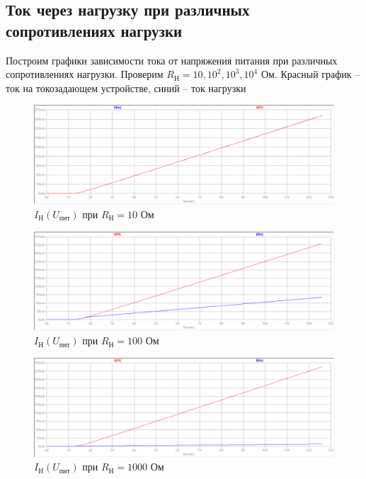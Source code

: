 \documentclass[a4paper, 12pt]{article}
\begin{document}
    \subsection{Ток через нагрузку при различных сопротивлениях нагрузки}
    Построим графики зависимости тока от напряжения питания при различных сопротивлениях нагрузки.
    Проверим $R_\text{Н}=10,10^2,10^3,10^4$ Ом. Красный график -- ток на токозадающем устройстве,
    синий -- ток нагрузки
    \begin{figure}[H]
        \centering
        \includegraphics[scale=0.46]{2task_Iн(Vпит)_Rн10.png}
        \captionsetup{skip=0pt}
        \caption{$I_\text{Н}\left( U_\text{пит} \right)$ при $R_\text{Н}=10$ Ом}
        \label{fig:2task_InVlR10}
    \end{figure}
    \begin{figure}[H]
        \centering
        \includegraphics[scale=0.46]{2task_Iн(Vпит)_Rн100.png}
        \captionsetup{skip=0pt}
        \caption{$I_\text{Н}\left( U_\text{пит} \right)$ при $R_\text{Н}=100$ Ом}
        \label{fig:2task_InVlR100}
    \end{figure}
    \begin{figure}[H]
        \centering
        \includegraphics[scale=0.46]{2task_Iн(Vпит)_Rн1000.png}
        \captionsetup{skip=0pt}
        \caption{$I_\text{Н}\left( U_\text{пит} \right)$ при $R_\text{Н}=1000$ Ом}
        \label{fig:2task_InVlR1000}
    \end{figure}
\end{document}
